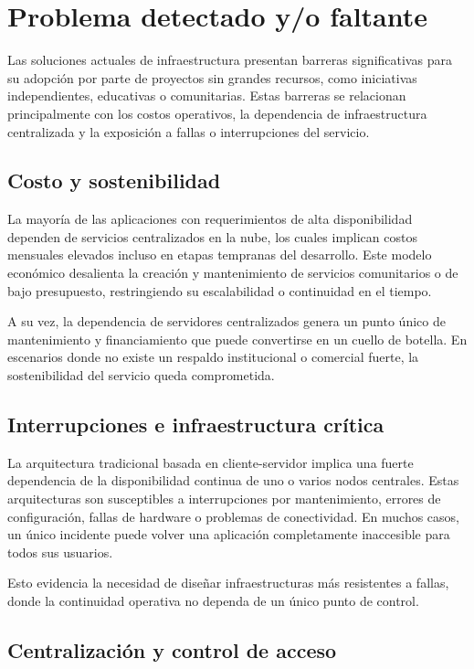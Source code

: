\section{Problema detectado y/o faltante}

Las soluciones actuales de infraestructura presentan barreras significativas para su adopción por parte de proyectos sin grandes recursos, como iniciativas independientes, educativas o comunitarias. Estas barreras se relacionan principalmente con los costos operativos, la dependencia de infraestructura centralizada y la exposición a fallas o interrupciones del servicio.

\subsection{Costo y sostenibilidad}

La mayoría de las aplicaciones con requerimientos de alta disponibilidad dependen de servicios centralizados en la nube, los cuales implican costos mensuales elevados incluso en etapas tempranas del desarrollo. Este modelo económico desalienta la creación y mantenimiento de servicios comunitarios o de bajo presupuesto, restringiendo su escalabilidad o continuidad en el tiempo.

A su vez, la dependencia de servidores centralizados genera un punto único de mantenimiento y financiamiento que puede convertirse en un cuello de botella. En escenarios donde no existe un respaldo institucional o comercial fuerte, la sostenibilidad del servicio queda comprometida.

\subsection{Interrupciones e infraestructura crítica}

La arquitectura tradicional basada en cliente-servidor implica una fuerte dependencia de la disponibilidad continua de uno o varios nodos centrales. Estas arquitecturas son susceptibles a interrupciones por mantenimiento, errores de configuración, fallas de hardware o problemas de conectividad. En muchos casos, un único incidente puede volver una aplicación completamente inaccesible para todos sus usuarios.

Esto evidencia la necesidad de diseñar infraestructuras más resistentes a fallas, donde la continuidad operativa no dependa de un único punto de control.

\subsection{Centralización y control de acceso}

